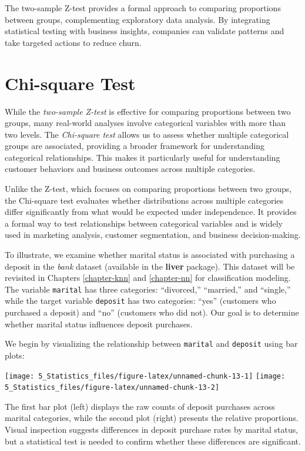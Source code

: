 \documentclass[
  11pt,
]{book}
\theoremstyle{definition}
\theoremstyle{definition}
\theoremstyle{definition}
\theoremstyle{definition}
\theoremstyle{remark}
\begin{document}
The two-sample Z-test provides a formal approach to comparing proportions between groups, complementing exploratory data analysis. By integrating statistical testing with business insights, companies can validate patterns and take targeted actions to reduce churn.

\section{Chi-square Test}\label{chi-square-test}

While the \emph{two-sample Z-test} is effective for comparing proportions between two groups, many real-world analyses involve categorical variables with more than two levels. The \emph{Chi-square test} allows us to assess whether multiple categorical groups are associated, providing a broader framework for understanding categorical relationships. This makes it particularly useful for understanding customer behaviors and business outcomes across multiple categories.

Unlike the Z-test, which focuses on comparing proportions between two groups, the Chi-square test evaluates whether distributions across multiple categories differ significantly from what would be expected under independence. It provides a formal way to test relationships between categorical variables and is widely used in marketing analysis, customer segmentation, and business decision-making.

To illustrate, we examine whether marital status is associated with purchasing a deposit in the \emph{bank} dataset (available in the \textbf{liver} package). This dataset will be revisited in Chapters \ref{chapter-knn} and \ref{chapter-nn} for classification modeling. The variable \texttt{marital} has three categories: ``divorced,'' ``married,'' and ``single,'' while the target variable \texttt{deposit} has two categories: ``yes'' (customers who purchased a deposit) and ``no'' (customers who did not). Our goal is to determine whether marital status influences deposit purchases.

We begin by visualizing the relationship between \texttt{marital} and \texttt{deposit} using bar plots:

\texttt{[image: 5\_Statistics\_files/figure-latex/unnamed-chunk-13-1]} \texttt{[image: 5\_Statistics\_files/figure-latex/unnamed-chunk-13-2]}

The first bar plot (left) displays the raw counts of deposit purchases across marital categories, while the second plot (right) presents the relative proportions. Visual inspection suggests differences in deposit purchase rates by marital status, but a statistical test is needed to confirm whether these differences are significant.
\end{document}
